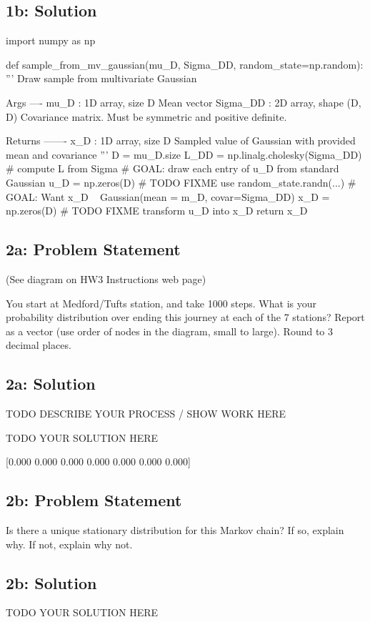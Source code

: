 \documentclass[10pt]{article}
\newcommand{\officialdirections}[1]{{\color{purple} #1}}
\begin{document}
\subsection{1b: Solution}
\begin{python}
import numpy as np

def sample_from_mv_gaussian(mu_D, Sigma_DD, random_state=np.random):
	''' Draw sample from multivariate Gaussian

	Args
	----
	mu_D : 1D array, size D
		Mean vector
	Sigma_DD : 2D array, shape (D, D)
		Covariance matrix. Must be symmetric and positive definite.

	Returns
	-------
	x_D : 1D array, size D
		Sampled value of Gaussian with provided mean and covariance
	'''
	D = mu_D.size
	L_DD = np.linalg.cholesky(Sigma_DD) # compute L from Sigma
	# GOAL: draw each entry of u_D from standard Gaussian 
	u_D = np.zeros(D) # TODO FIXME use random_state.randn(...)
	# GOAL: Want x_D ~ Gaussian(mean = m_D, covar=Sigma_DD)
	x_D = np.zeros(D) # TODO FIXME transform u_D into x_D 
	return x_D
\end{python}

\newpage 

\officialdirections{
\subsection*{2a: Problem Statement}
(See diagram on HW3 Instructions web page)

You start at Medford/Tufts station, and take 1000 steps. What is your probability distribution over ending this journey at each of the 7 stations? Report as a vector (use order of nodes in the diagram, small to large). Round to 3 decimal places.
}

\subsection{2a: Solution}
TODO DESCRIBE YOUR PROCESS / SHOW WORK HERE

TODO YOUR SOLUTION HERE

[0.000 0.000 0.000 0.000 0.000 0.000 0.000]

\officialdirections{
\subsection*{2b: Problem Statement}
Is there a unique stationary distribution for this Markov chain? If so, explain why. If not, explain why not.
}


\subsection{2b: Solution}
TODO YOUR SOLUTION HERE
\end{document}
